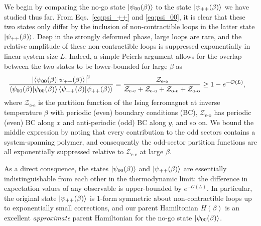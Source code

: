 We begin by comparing the no-go state $\ket{\psi_{00}(\beta)}$ to the state $\ket{\psi_{++}(\beta)}$ we have studied thus far. From Eqs.~\eqref{eq:psi_++} and \eqref{eq:psi_00}, it is clear that these two states only differ by the inclusion of non-contractible loops in the latter state $\ket{\psi_{++}(\beta)}$. Deep in the strongly deformed phase, large loops are rare, and the relative amplitude of these non-contractible loops is suppressed exponentially in linear system size $L$. Indeed, a simple Peierls argument \cite{Friedli_Velenik_2017} allows for the overlap between the two states to be lower-bounded for large $\beta$ as
\begin{align}
    \frac{\abs{\braket{\psi_{00}(\beta)}{\psi_{++}(\beta)}}^2}{\braket{\psi_{00}(\beta)}{\psi_{00}(\beta)}\braket{\psi_{++}(\beta)}{\psi_{++}(\beta)}}  &= \frac{\mathcal{Z}_\text{e-e} }{\mathcal{Z}_\text{e-e} + \mathcal{Z}_\text{e-o} + \mathcal{Z}_\text{o-e} + \mathcal{Z}_\text{o-o}} \geq 1 - e^{-\mathcal{O}(L)} ,
\end{align}
where $\mathcal{Z}_{\text{e-e}}$ is the partition function of the Ising ferromagnet at inverse temperature $\beta$ with periodic (even) boundary conditions (BC), $\mathcal{Z}_{\text{e-o}}$ has periodic (even) BC along $x$ and anti-periodic (odd) BC along $y$, and so on. We bound the middle expression by noting that every contribution to the odd sectors contains a system-spanning polymer, and consequently the odd-sector partition functions are all exponentially suppressed relative to $\mathcal{Z}_{\text{e-e}}$ at large $\beta$.



As a direct consquence, the states $\ket{\psi_{00}(\beta)}$ and $\ket{\psi_{++}(\beta)}$ are essentially indistinguishable from each other in the thermodynamic limit: the difference in expectation values of any observable is upper-bounded by $e^{-\mathcal{O}(L)}$. In particular, the original state $\ket{\psi_{++}(\beta)}$ is 1-form symmetric about non-contractible loops up to exponentially small corrections, and our parent Hamiltonian $H(\beta)$ is an excellent \emph{approximate} parent Hamiltonian for the no-go state $\ket{\psi_{00}(\beta)}$. 

